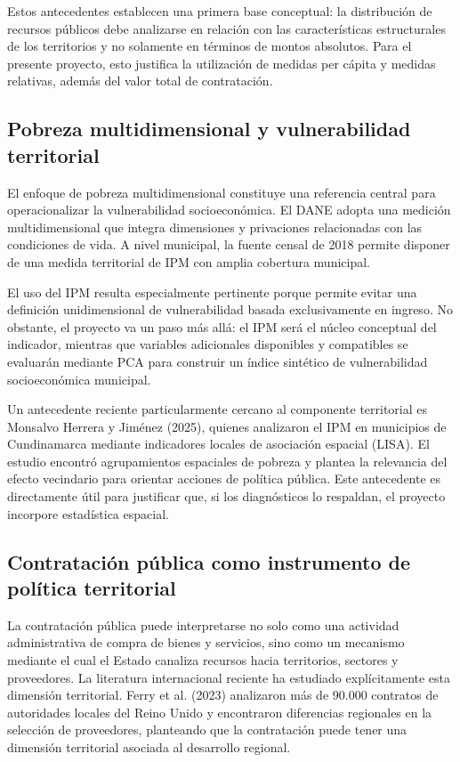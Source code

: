 \documentclass[11pt,letterpaper]{article}
\begin{document}
Estos antecedentes establecen una primera base conceptual: la distribución de
recursos públicos debe analizarse en relación con las características
estructurales de los territorios y no solamente en términos de montos
absolutos. Para el presente proyecto, esto justifica la utilización de medidas
per cápita y medidas relativas, además del valor total de contratación.

\subsection{Pobreza multidimensional y vulnerabilidad territorial}

El enfoque de pobreza multidimensional constituye una referencia central para
operacionalizar la vulnerabilidad socioeconómica. El DANE adopta una medición
multidimensional que integra dimensiones y privaciones relacionadas con las
condiciones de vida. A nivel municipal, la fuente censal de 2018 permite
disponer de una medida territorial de IPM con amplia cobertura municipal.

El uso del IPM resulta especialmente pertinente porque permite evitar una
definición unidimensional de vulnerabilidad basada exclusivamente en ingreso.
No obstante, el proyecto va un paso más allá: el IPM será el núcleo conceptual
del indicador, mientras que variables adicionales disponibles y compatibles se
evaluarán mediante PCA para construir un índice sintético de vulnerabilidad
socioeconómica municipal.

Un antecedente reciente particularmente cercano al componente territorial es
Monsalvo Herrera y Jiménez (2025), quienes analizaron el IPM en municipios de
Cundinamarca mediante indicadores locales de asociación espacial (LISA). El
estudio encontró agrupamientos espaciales de pobreza y plantea la relevancia
del efecto vecindario para orientar acciones de política pública. Este
antecedente es directamente útil para justificar que, si los diagnósticos lo
respaldan, el proyecto incorpore estadística espacial.

\subsection{Contratación pública como instrumento de política territorial}

La contratación pública puede interpretarse no solo como una actividad
administrativa de compra de bienes y servicios, sino como un mecanismo mediante
el cual el Estado canaliza recursos hacia territorios, sectores y proveedores.
La literatura internacional reciente ha estudiado explícitamente esta dimensión
territorial. Ferry et al. (2023) analizaron más de 90.000 contratos de
autoridades locales del Reino Unido y encontraron diferencias regionales en la
selección de proveedores, planteando que la contratación puede tener una
dimensión territorial asociada al desarrollo regional.
\end{document}
